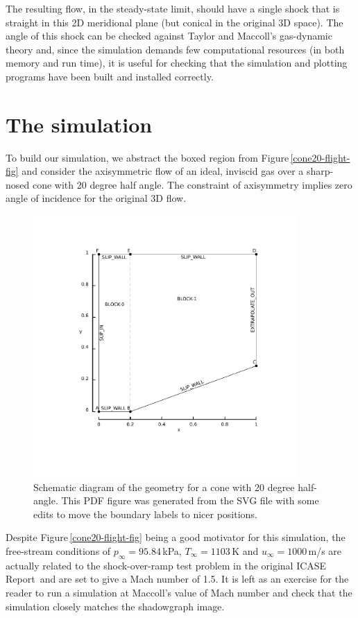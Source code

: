 \medskip
The resulting flow, in the steady-state limit, should have a single shock that is 
straight in this 2D meridional plane (but conical in the original 3D space).
The angle of this shock can be checked against Taylor and Maccoll's gas-dynamic theory and,
since the simulation demands few computational resources (in both memory and run time), 
it is useful for checking that the simulation and
plotting programs have been built and installed correctly.

\section{The simulation}
%
To build our simulation, we abstract the boxed region from Figure\,\ref{cone20-flight-fig}
and consider the axisymmetric flow of an ideal, inviscid gas over a sharp-nosed cone 
with 20 degree half angle.
The constraint of axisymmetry implies zero angle of incidence for the original 3D flow.

\begin{figure}[htbp]
\begin{center}
\includegraphics[width=10cm, viewport=76 78 389 398]{../2D/cone20-simple/cone20_svg.pdf}
\end{center}
\caption{Schematic diagram of the geometry for a cone 
         with 20 degree half-angle.
	 This PDF figure was generated from the SVG file with some edits 
	 to move the boundary labels to nicer positions.}
\label{cone20-geometry-fig}
\end{figure}

\medskip
Despite Figure\,\ref{cone20-flight-fig} being a good motivator for this simulation,
the free-stream conditions of $p_{\infty} = 95.84$\,kPa, $T_{\infty} = 1103$\,K
and $u_{\infty} = 1000$\,m/s are actually related to the shock-over-ramp test problem
in the original ICASE Report\,\cite{jacobs_91d} and are set to give a Mach number of 1.5.
It is left as an exercise for the reader to run a simulation at Maccoll's value of
Mach number and check that the simulation closely matches the shadowgraph image.


